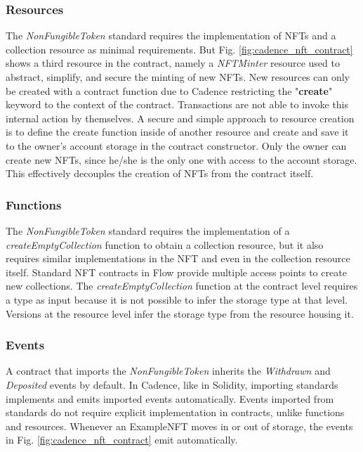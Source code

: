 \documentclass[../NFTComp_IEEE.tex]{subfiles}
\begin{document}
\subsubsection{Resources}
The \textit{NonFungibleToken} standard requires the implementation of NFTs and a collection resource as minimal requirements. But Fig. \ref{fig:cadence_nft_contract} shows a third resource in the contract, namely a \textit{NFTMinter} resource used to abstract, simplify, and secure the minting of new NFTs. New resources can only be created with a contract function due to Cadence restricting the "\textbf{create}" keyword to the context of the contract. Transactions are not able to invoke this internal action by themselves. A secure and simple approach to resource creation is to define the create function inside of another resource and create and save it to the owner's account storage in the contract constructor. Only the owner can create new NFTs, since he/she is the only one with access to the account storage. This effectively decouples the creation of NFTs from the contract itself.

\subsubsection{Functions}
The \textit{NonFungibleToken} standard requires the implementation of a \textit{createEmptyCollection} function to obtain a collection resource, but it also requires similar implementations in the NFT and even in the collection resource itself. Standard NFT contracts in Flow provide multiple access points to create new collections. The \textit{createEmptyCollection} function at the contract level requires a type as input because it is not possible to infer the storage type at that level. Versions at the resource level infer the storage type from the resource housing it.

\subsubsection{Events}
A contract that imports the \textit{NonFungibleToken} inherits the \textit{Withdrawn} and \textit{Deposited} events by default. In Cadence, like in Solidity, importing standards implements and emits imported events automatically. Events imported from standards do not require explicit implementation in contracts, unlike functions and resources. Whenever an ExampleNFT moves in or out of storage, the events in Fig. \ref{fig:cadence_nft_contract} emit automatically.
\end{document}
